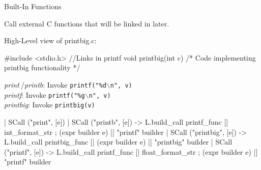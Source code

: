 \documentclass{plt}
\begin{document}
\begin{frame}[fragile]{Built-In Functions}

Call external C functions that will be linked in later.

High-Level view of printbig.c:

\begin{C}
#include <stdio.h> //Links in printf
void printbig(int c) {
  /* Code implementing printbig functionality */
}
\end{C}

\emph{print}$\ $/\emph{printb}: Invoke \texttt{printf("\%d$\backslash$n", v)} \\
\emph{printf}: Invoke \texttt{printf("\%g$\backslash$n", v)} \\
\emph{printbig}: Invoke \texttt{printbig(v)}

\begin{ocaml}
| SCall ("print", [e]) | SCall ("printb", [e]) ->
    L.build_call printf_func [| int_format_str ; (expr builder e) |]
                 "printf" builder
| SCall ("printbig", [e]) ->
    L.build_call printbig_func [| (expr builder e) |]
                 "printbig" builder
| SCall ("printf", [e]) -> 
    L.build_call printf_func [| float_format_str ; (expr builder e) |]
                 "printf" builder
\end{ocaml}
\end{frame}
\end{document}
